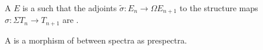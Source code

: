 \begin{definition} \label{definition:spectrum_of_topological_spaces}
    A  $E$ is a  such that the adjoints $\tilde{\sigma}: E_n \to \Omega E_{n+1}$ to the structure maps $\sigma: \Sigma T_n \to T_{n+1}$ are . 
    
    A  is a morphism of between spectra as prespectra.
\end{definition}